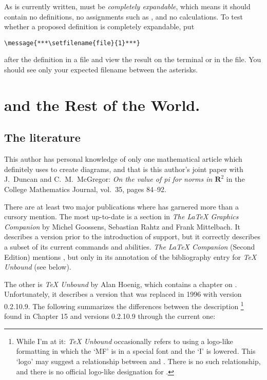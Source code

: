 \documentclass[letterpaper]{article}
\begin{document}
As \mfp{} is currently written,  must be
\emph{completely expandable}, which means it should contain no
definitions, no assignments such as , and no
calculations. To test whether a proposed definition is completely
expandable, put
\begin{verbatim}
\message{***\setfilename{file}{1}***}
\end{verbatim}
after the definition in a  file and view the result on the
terminal or in the  file. You should see only your expected
filename between the asterisks.


\section{ and the Rest of the World.}

\subsection{The literature}

This author has personal knowledge of only one mathematical article
which definitely uses \mfp{} to create diagrams, and that is this
author's joint paper with J.~Duncan and C.~M.~McGregor: \textit{On the
value of pi for norms in $\mathbf{R}^2$} in the College Mathematics
Journal, vol.~35, pages 84--92.

There are at least two major publications where \mfp{} has garnered more
than a cursory mention. The most up-to-date is a section in \textit{The
\LaTeX{} Graphics Companion} by Michel Goossens, Sebastian Rahtz and
Frank Mittelbach. It describes a version prior to the introduction of
\MP{} support, but it correctly describes a subset of its current
commands and abilities. \textit{The \LaTeX{} Companion} (Second Edition)
mentions \mfp{}, but only in its annotation of the bibliography entry
for \textit{\TeX{} Unbound} (see below).

The other is \textit{\TeX{} Unbound} by Alan Hoenig, which contains a
chapter on \mfp{}. Unfortunately, it describes a version that was
replaced in 1996 with version 0.2.10.9.  The following summarizes the
differences between the description%
    \footnote{While I'm at it: \textit{\TeX{} Unbound} occasionally
    refers to \mfp{} using a logo-like formatting in which the `MF' is
    in a special font and the `I' is lowered. This `logo' may suggest
    a relationship between \mfp{} and \PiCTeX{}. There is no such
    relationship, and there is no official logo-like designation for
    \mfp{}.} %
found in Chapter 15 and \mfp{} versions 0.2.10.9 through the
current one:
\end{document}
